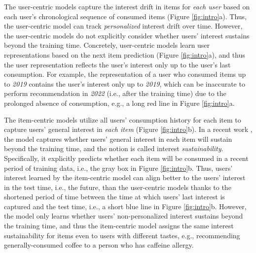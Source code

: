 \documentclass[sigconf]{acmart}
\begin{document}
The user-centric models capture the interest drift in items for \textit{each user} based on each user's chronological sequence of consumed items \cite{ma2019hierarchical,li2021lightweight} (Figure \ref{fig:intro}a). Thus, the user-centric model can track \textit{personalized} interest drift over time. 
However, the user-centric models do not explicitly consider whether users’ interest sustains beyond the training time. 
Concretely, user-centric models learn user representations based on the next item prediction (Figure \ref{fig:intro}a), and thus the user representation reflects the user's interest only up to the user's last consumption. For example, the representation of a user who consumed items up to \textit{2019} contains the user's interest only up to \textit{2019}, which can be inaccurate to perform  recommendation in \textit{2022} (i.e., after the training time) due to the prolonged absence of consumption, e.g., a long red line in Figure \ref{fig:intro}a. 

The item-centric models utilize all users' consumption history for each item to capture users' general interest in \textit{each item} \cite{wang2019modeling,hyun2020interest} (Figure \ref{fig:intro}b). In a recent work \cite{hyun2020interest}, the model captures whether users' general interest in each item will sustain beyond the training time, and the notion is called interest \textit{sustainability}. Specifically, it explicitly predicts whether each item will be consumed in a recent period of training data, i.e., the gray box in Figure \ref{fig:intro}b. 
Thus, users' interest learned by the item-centric model can align better to the users' interest in the test time, i.e., the future, than the user-centric models thanks to the shortened period of time between the time at which users' last interest is captured and the test time, i.e., a short blue line in Figure \ref{fig:intro}b.
However, the model only learns whether users' non-personalized interest sustains beyond the training time, and thus the item-centric model assigns the same interest sustainability for items even to users with different tastes, e.g., recommending generally-consumed coffee to a person who has caffeine allergy. 
\end{document}

